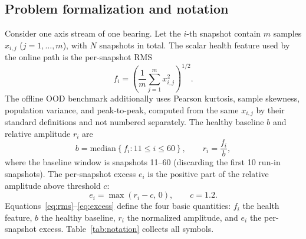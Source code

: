 \documentclass[journal]{IEEEtran}
\begin{document}
\subsection{Problem formalization and notation}
Consider one axis stream of one bearing. Let the $i$-th snapshot contain $m$ samples $x_{i,j}$ ($j=1,\dots,m$), with $N$ snapshots in total. The scalar health feature used by the online path is the per-snapshot RMS
\begin{equation}
f_i=\left(\frac{1}{m}\sum_{j=1}^{m}x_{i,j}^{2}\right)^{1/2}.
\label{eq:rms}
\end{equation}
The offline OOD benchmark additionally uses Pearson kurtosis, sample skewness, population variance, and peak-to-peak, computed from the same $x_{i,j}$ by their standard definitions and not numbered separately. The healthy baseline $b$ and relative amplitude $r_i$ are
\begin{equation}
b=\mathrm{median}\left\{f_i:11\le i\le60\right\},\qquad r_i=\frac{f_i}{b},
\label{eq:baseline}
\end{equation}
where the baseline window is snapshots 11--60 (discarding the first 10 run-in snapshots). The per-snapshot excess $e_i$ is the positive part of the relative amplitude above threshold $c$:
\begin{equation}
e_i=\max\left(r_i-c,\,0\right),\qquad c=1.2.
\label{eq:excess}
\end{equation}
Equations~\eqref{eq:rms}--\eqref{eq:excess} define the four basic quantities: $f_i$ the health feature, $b$ the healthy baseline, $r_i$ the normalized amplitude, and $e_i$ the per-snapshot excess. Table~\ref{tab:notation} collects all symbols.
\end{document}
